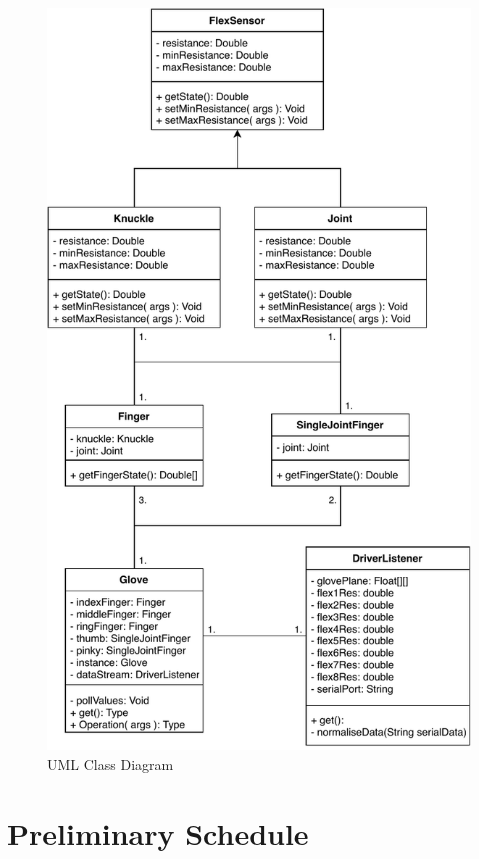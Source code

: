 \documentclass[12pt,a4paper,oneside]{book}
\theoremstyle{plain}
\numberwithin{equation}{chapter}
\begin{document}
\begin{figure}
    \centering
    \includegraphics[]{res/UMLClassDiagram.pdf}
    \caption{UML Class Diagram}
    \label{fig:UMLClassDiagram}
\end{figure}

\chapter*{Preliminary Schedule}
\end{document}

